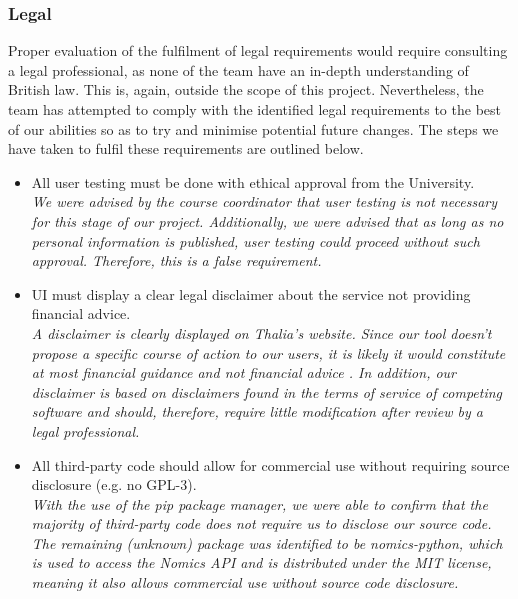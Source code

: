 \documentclass[main.tex]{subfiles}
\begin{document}
\subsubsection{Legal}
Proper evaluation of the fulfilment of legal requirements would require consulting a legal professional, as none of the team have an in-depth understanding of British law. This is, again, outside the scope of this project. Nevertheless, the team has attempted to comply with the identified legal requirements to the best of our abilities so as to try and minimise potential future changes. The steps we have taken to fulfil these requirements are outlined below. 
\begin{itemize}
    
    \item All user testing must be done with ethical approval from the University.\\
    \textit{We were advised by the course coordinator that user testing is not necessary for this stage of our project. Additionally, we were advised that as long as no personal information is published, user testing could proceed without such approval. Therefore, this is a false requirement.}
    
    \item UI must display a clear legal disclaimer about the service not providing financial advice.\\
    \textit{A disclaimer is clearly displayed on Thalia’s website. Since our tool doesn't propose a specific course of action to our users, it is likely it would constitute at most financial guidance and not financial advice \cite{FinAdvice}. In addition, our disclaimer is based on disclaimers found in the terms of service of competing software \cite{portfolioVisualizerToS} and should, therefore, require little modification after review by a legal professional.}
    
    \item All third-party code should allow for commercial use without requiring source disclosure (e.g. no GPL-3).\\
    \textit{With the use of the pip package manager, we were able to confirm that the majority of third-party code does not require us to disclose our source code. The remaining (unknown) package was identified to be nomics-python, which is used to access the Nomics API and is distributed under the MIT license, meaning it also allows commercial use without source code disclosure.}
    

\end{itemize}
\end{document}
